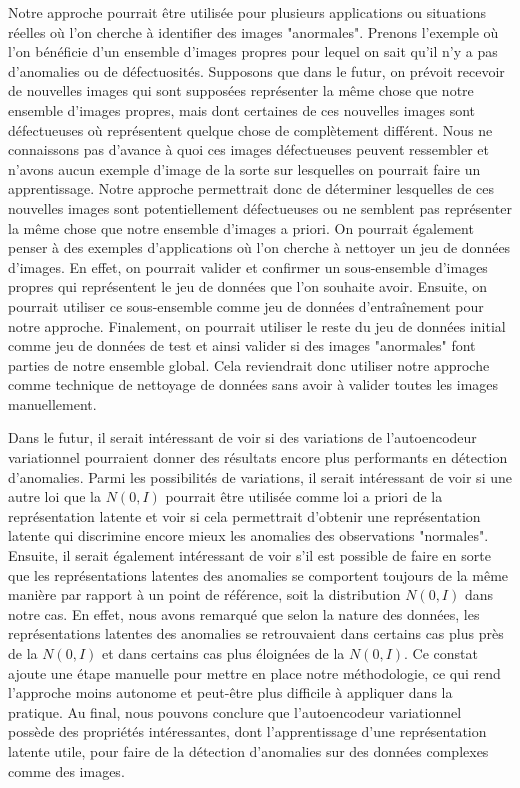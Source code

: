 Notre approche pourrait être utilisée pour plusieurs applications ou situations réelles où l'on cherche à identifier des images "anormales". Prenons l'exemple où l'on bénéficie d'un ensemble d'images propres pour lequel on sait qu'il n'y a pas d'anomalies ou de défectuosités. Supposons que dans le futur, on prévoit recevoir de nouvelles images qui sont supposées représenter la même chose que notre ensemble d'images propres, mais dont certaines de ces nouvelles images sont défectueuses où représentent quelque chose de complètement différent. Nous ne connaissons pas d'avance à quoi ces images défectueuses peuvent ressembler et n'avons aucun exemple d'image de la sorte sur lesquelles on pourrait faire un apprentissage. Notre approche permettrait donc de déterminer lesquelles de ces nouvelles images sont potentiellement défectueuses ou ne semblent pas représenter la même chose que notre ensemble d'images a priori. On pourrait également penser à des exemples d'applications où l'on cherche à nettoyer un jeu de données d'images. En effet, on pourrait valider et confirmer un sous-ensemble d'images propres qui représentent le jeu de données que l'on souhaite avoir. Ensuite, on pourrait utiliser ce sous-ensemble comme jeu de données d'entraînement pour notre approche. Finalement, on pourrait utiliser le reste du jeu de données initial comme jeu de données de test et ainsi valider si des images "anormales" font parties de notre ensemble global. Cela reviendrait donc utiliser notre approche comme technique de nettoyage de données sans avoir à valider toutes les images manuellement.

Dans le futur, il serait intéressant de voir si des variations de l'autoencodeur variationnel pourraient donner des résultats encore plus performants en détection d'anomalies. Parmi les possibilités de variations, il serait intéressant de voir si une autre loi que la $N(0,I)$ pourrait être utilisée comme loi a priori de la représentation latente et voir si cela permettrait d'obtenir une représentation latente qui discrimine encore mieux les anomalies des observations "normales". Ensuite, il serait également intéressant de voir s'il est possible de faire en sorte que les représentations latentes des anomalies se comportent toujours de la même manière par rapport à un point de référence, soit la distribution $N(0,I)$ dans notre cas. En effet, nous avons remarqué que selon la nature des données, les représentations latentes des anomalies se retrouvaient dans certains cas plus près de la $N(0,I)$ et dans certains cas  plus éloignées de la $N(0,I)$. Ce constat ajoute une étape manuelle pour mettre en place notre méthodologie, ce qui rend l'approche moins autonome et peut-être plus difficile à appliquer dans la pratique. Au final, nous pouvons conclure que l'autoencodeur variationnel possède des propriétés intéressantes, dont l'apprentissage d'une représentation latente utile, pour faire de la détection d'anomalies sur des données complexes comme des images.


